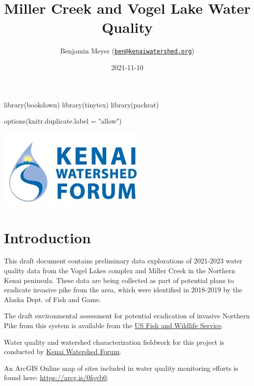 \documentclass[
]{book}
\title{Miller Creek and Vogel Lake Water Quality}
\author{Benjamin Meyer (\href{mailto:ben@kenaiwatershed.org}{\nolinkurl{ben@kenaiwatershed.org}})}
\date{2021-11-10}
\newenvironment{Shaded}{\begin{snugshade}}{\end{snugshade}}
\newcommand{\AttributeTok}[1]{\textcolor[rgb]{0.77,0.63,0.00}{#1}}
\newcommand{\FunctionTok}[1]{\textcolor[rgb]{0.00,0.00,0.00}{#1}}
\newcommand{\NormalTok}[1]{#1}
\newcommand{\StringTok}[1]{\textcolor[rgb]{0.31,0.60,0.02}{#1}}
\begin{document}
\maketitle

{
\setcounter{tocdepth}{1}
\tableofcontents
}
\begin{Shaded}
\begin{Highlighting}[]
\FunctionTok{library}\NormalTok{(bookdown)}
\FunctionTok{library}\NormalTok{(tinytex)}
\FunctionTok{library}\NormalTok{(packrat)}

\FunctionTok{options}\NormalTok{(}\AttributeTok{knitr.duplicate.label =} \StringTok{"allow"}\NormalTok{)}
\end{Highlighting}
\end{Shaded}

\includegraphics{images/KWF_logo.png}

\hypertarget{introduction}{%
\chapter{Introduction}\label{introduction}}

This draft document contains preliminary data explorations of 2021-2023 water quality data from the Vogel Lakes complex and Miller Creek in the Northern Kenai peninsula. These data are being collected as part of potential plans to eradicate invasive pike from the area, which were identified in 2018-2019 by the Alaska Dept. of Fish and Game.

The draft environmental assessment for potential eradication of invasive Northern Pike from this system is available from the \href{https://www.fws.gov/uploadedFiles/Region_7/NWRS/Zone_2/Kenai/PDF/Draft\%20EA\%20Northern\%20Pike\%20KNWR.pdf}{US Fish and Wildlife Service}.

Water quality and watershed characterization fieldwork for this project is conducted by \href{https://www.kenaiwatershed.org/}{Kenai Watershed Forum}.

An ArcGIS Online map of sites included in water quality monitoring efforts is found here: \url{https://arcg.is/0fqvb0}.
\end{document}

